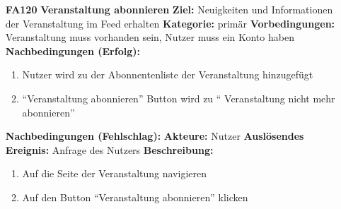 \documentclass[parskip=full]{scrartcl}
\begin{document}
\begin{itemize}[nosep]
			\item[\textbf{FA120}]\textbf{Veranstaltung abonnieren}
			\newline \textbf{Ziel:} Neuigkeiten und Informationen der Veranstaltung im Feed erhalten
			\newline \textbf{Kategorie:} primär
			\newline \textbf{Vorbedingungen:} Veranstaltung muss vorhanden sein, Nutzer muss ein Konto haben
			\newline \textbf{Nachbedingungen (Erfolg):} 
			\begin{enumerate}[nosep]
				\item Nutzer wird zu der Abonnentenliste der Veranstaltung hinzugefügt
				\item “Veranstaltung abonnieren” Button wird zu “ Veranstaltung nicht mehr abonnieren” 
			\end{enumerate}
			\textbf{Nachbedingungen (Fehlschlag):}
			\newline \textbf{Akteure:} Nutzer
			\newline \textbf{Auslösendes Ereignis:} Anfrage des Nutzers
			\newline \textbf{Beschreibung:}
			\begin{enumerate}[nosep]
				\item Auf die Seite der Veranstaltung navigieren
				\item Auf den Button “Veranstaltung abonnieren” klicken\\
			\end{enumerate}
						

\end{itemize}
\end{document}
